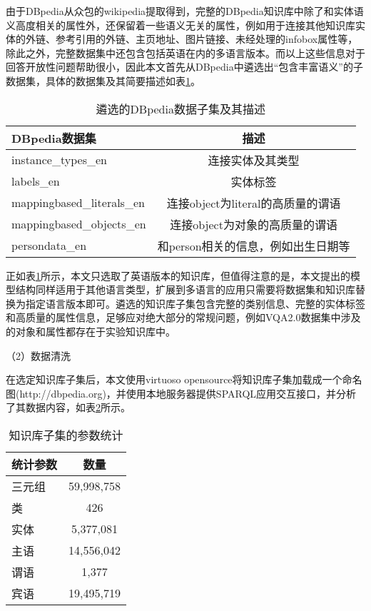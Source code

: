 由于DBpedia从众包的wikipedia提取得到，完整的DBpedia知识库中除了和实体语义高度相关的属性外，还保留着一些语义无关的属性，例如用于连接其他知识库实体的外链、参考引用的外链、主页地址、图片链接、未经处理的infobox属性等，除此之外，完整数据集中还包含包括英语在内的多语言版本。而以上这些信息对于回答开放性问题帮助很小，因此本文首先从DBpedia中遴选出“包含丰富语义”的子数据集，具体的数据集及其简要描述如表\ref{dbpeidaList}。
\begin{table}[H]
\centering
\caption{遴选的DBpedia数据子集及其描述}
\begin{adjustbox}{max width=0.8\textwidth}
\begin{tabular}{lc}
\toprule
DBpedia数据集 & 描述\\
\midrule
instance\_types\_en & 连接实体及其类型 \\
labels\_en & 实体标签 \\
mappingbased\_literals\_en & 连接object为literal的高质量的谓语 \\
mappingbased\_objects\_en & 连接object为对象的高质量的谓语 \\
persondata\_en & 和person相关的信息，例如出生日期等 \\
\bottomrule
\end{tabular}
\end{adjustbox}
\label{dbpeidaList}
\end{table}

正如表\ref{dbpeidaList}所示，本文只选取了英语版本的知识库，但值得注意的是，本文提出的模型结构同样适用于其他语言类型，扩展到多语言的应用只需要将数据集和知识库替换为指定语言版本即可。遴选的知识库子集包含完整的类别信息、完整的实体标签和高质量的属性信息，足够应对绝大部分的常规问题，例如VQA2.0数据集中涉及的对象和属性都存在于实验知识库中。


（2）数据清洗

在选定知识库子集后，本文使用virtuoso opensource将知识库子集加载成一个命名图(http://dbpedia.org)，并使用本地服务器提供SPARQL应用交互接口，并分析了其数据内容，如表\ref{dbpediaPara}所示。
\begin{table}[H]
\centering
\caption{知识库子集的参数统计}
\begin{tabular}{lc}
\toprule
统计参数 & 数量\\
\midrule
三元组 &  59,998,758\\
类 &  426\\
实体 & 5,377,081 \\
主语 & 14,556,042 \\
谓语 & 1,377 \\
宾语 & 19,495,719 \\
\bottomrule
\end{tabular}
\label{dbpediaPara}
\end{table}


